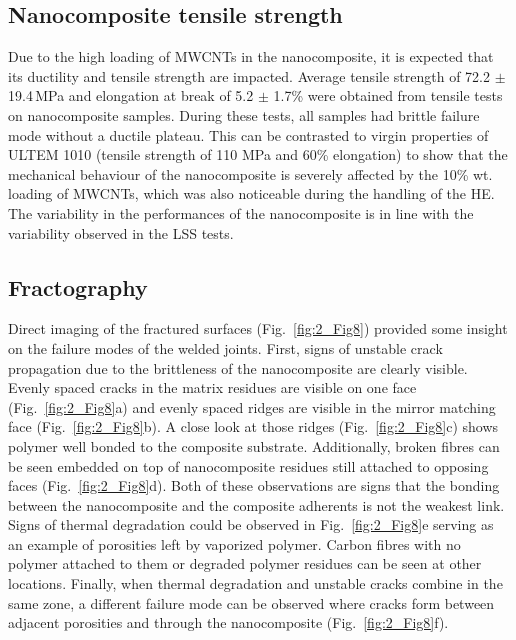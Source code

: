 \FloatBarrier
\subsection{Nanocomposite tensile strength}

Due to the high loading of MWCNTs in the nanocomposite, it is expected that its ductility and tensile strength are impacted. 
Average tensile strength of 72.2 $\pm$ \mbox{19.4\,MPa} and elongation at break of 5.2 $\pm$ 1.7\% were obtained from tensile tests on nanocomposite samples. 
During these tests, all samples had brittle failure mode without a ductile plateau. 
This can be contrasted to virgin properties of ULTEM 1010 (tensile strength of 110 MPa and 60\% elongation) to show that the mechanical behaviour of the nanocomposite is severely affected by the 10\% wt. loading of MWCNTs, which was also noticeable during the handling of the HE. 
The variability in the performances of the nanocomposite is in line with the variability observed in the LSS tests. 

\subsection{Fractography}

Direct imaging of the fractured surfaces (\mbox{Fig. \ref{fig:2_Fig8}}) provided some insight on the failure modes of the welded joints. 
First, signs of unstable crack propagation due to the brittleness of the nanocomposite are clearly visible. 
Evenly spaced cracks in the matrix residues are visible on one face (\mbox{Fig. \ref{fig:2_Fig8}}a) and evenly spaced ridges are visible in the mirror matching face (\mbox{Fig. \ref{fig:2_Fig8}}b). 
A close look at those ridges (\mbox{Fig. \ref{fig:2_Fig8}}c) shows polymer well bonded to the composite substrate. 
Additionally, broken fibres can be seen embedded on top of nanocomposite residues still attached to opposing faces (\mbox{Fig. \ref{fig:2_Fig8}}d). 
Both of these observations are signs that the bonding between the nanocomposite and the composite adherents is not the weakest link. 
Signs of thermal degradation could be observed in \mbox{Fig. \ref{fig:2_Fig8}}e serving as an example of porosities left by vaporized polymer. 
Carbon fibres with no polymer attached to them or degraded polymer residues can be seen at other locations. 
Finally, when thermal degradation and unstable cracks combine in the same zone, a different failure mode can be observed where cracks form between adjacent porosities and through the nanocomposite (\mbox{Fig. \ref{fig:2_Fig8}}f).

